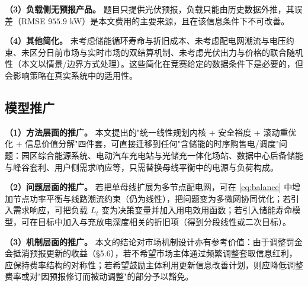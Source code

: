 \textbf{（3）负载侧无预报产品。} 题目只提供光伏预报，负载只能由历史数据外推，其误差（RMSE $955.9$ \si{kW}）是本文费用的主要来源，且在该信息条件下不可改善。

\textbf{（4）其他简化。} 未考虑储能循环寿命与折旧成本、未考虑配电网潮流与电压约束、未区分日前市场与实时市场的双结算机制、未考虑光伏出力与价格的联合随机性（本文以情景/边界方式处理）。这些简化在竞赛给定的数据条件下是必要的，但会影响策略在真实系统中的适用性。

\subsection{模型推广}

\textbf{（1）方法层面的推广。} 本文提出的"统一线性规划内核 $+$ 安全裕度 $+$ 滚动重优化 $+$ 信息价值分解"四件套，可直接迁移到任何"含储能的时序购售电/调度"问题：园区综合能源系统、电动汽车充电站与光储充一体化场站、数据中心后备储能与峰谷套利、用户侧需求响应等，只需替换母线平衡中的电源与负荷构成。

\textbf{（2）问题层面的推广。} 若把单母线扩展为多节点配电网，可在 \cref{eq:balance} 中增加节点功率平衡与线路潮流约束（仍为线性），把问题变为多微网协同优化；若引入需求响应，可把负载 $L_t$ 变为决策变量并加入用电效用函数；若引入储能寿命模型，可在目标中加入与充放电深度相关的折旧项（得到分段线性或二次目标）。

\textbf{（3）机制层面的推广。} 本文的结论对市场机制设计亦有参考价值：由于调整罚金会抵消预报更新的收益（\S5.6），若不希望市场主体通过频繁调整套取信息红利，应保持费率结构的对称性；若希望鼓励主体利用更新信息改善计划，则应降低调整费率或对"因预报修订而被动调整"的部分予以豁免。
